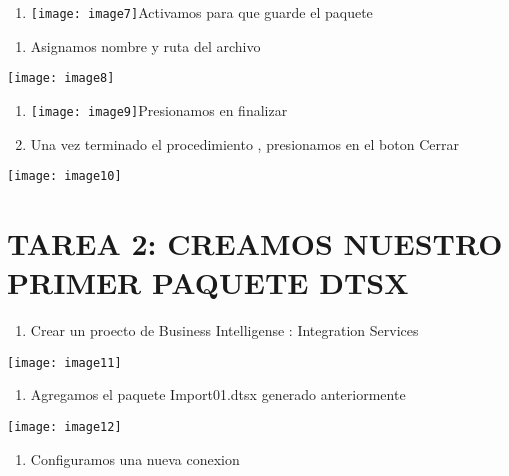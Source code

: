 \documentclass{article} %
\begin{document}
\begin{enumerate}
\item  \texttt{[image: image7]}Activamos para que guarde el paquete
\end{enumerate}

\noindent 

\begin{enumerate}
\item  Asignamos nombre y ruta del archivo
\end{enumerate}

\noindent \texttt{[image: image8]}

\begin{enumerate}
\item  \texttt{[image: image9]}Presionamos en finalizar

\item  Una vez terminado el procedimiento , presionamos en el boton Cerrar
\end{enumerate}

\noindent \texttt{[image: image10]}

\noindent 
\section{TAREA 2: CREAMOS NUESTRO PRIMER PAQUETE DTSX}

\begin{enumerate}
\item \textbf{\underbar{ }}Crear un proecto de Business Intelligense : Integration Services
\end{enumerate}

\noindent \texttt{[image: image11]}

\begin{enumerate}
\item  Agregamos el paquete Import01.dtsx generado anteriormente
\end{enumerate}

\noindent \texttt{[image: image12]}

\begin{enumerate}
\item  Configuramos una nueva conexion
\end{enumerate}
\end{document}
